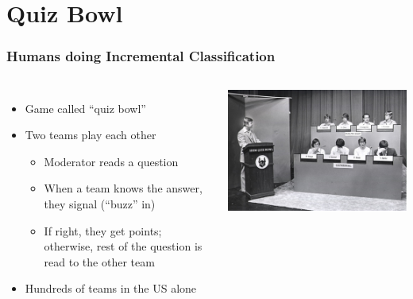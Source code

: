 \documentclass[compress]{beamer}
\begin{document}
\section{Quiz Bowl}

\begin{frame}
	\frametitle{Humans doing Incremental Classification}
	\begin{columns}

	\begin{itemize}
		\item Game called ``quiz bowl''
		\item Two teams play each other
		\begin{itemize}
			\item Moderator reads a question
			\item When a team knows the answer, they signal (``buzz'' in)
			\item If right, they get points; otherwise, rest of the question is read to the other team
		\end{itemize}
		\item Hundreds of teams in the US alone
	\end{itemize}

	\includegraphics{qb/quizbowl}

	\end{columns}

\end{frame}
\end{document}
